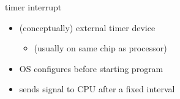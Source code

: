 \begin{frame}{timer interrupt}
\begin{itemize}
\item (conceptually) external timer device
    \begin{itemize}
    \item (usually on same chip as processor)
    \end{itemize}
\item OS configures before starting program
\item sends signal to CPU after a fixed interval
\end{itemize}
\end{frame}


